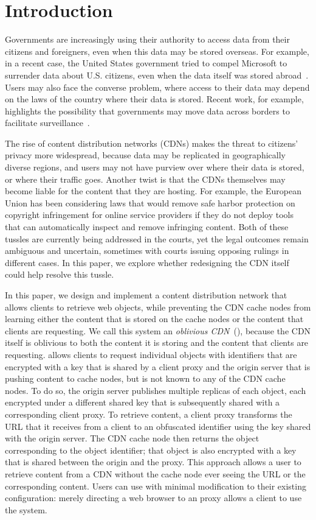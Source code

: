 \section{Introduction}
\label{sec:intro}

Governments are increasingly using their authority to access data from
their citizens and foreigners, even when this data may be stored overseas.  For
example, in a
recent case, the United States government tried to compel Microsoft to
surrender data about U.S. citizens, even when the data itself was stored
abroad~\cite{microsoft_ireland}. Users may also face the converse problem, where access to their data
may depend on the laws of the country where their data is stored. Recent work,
for example, highlights the possibility that governments may move data across
borders to facilitate surveillance~\cite{arnbak2015loopholes}.  

The rise of content distribution networks (CDNs) makes the threat to citizens'
privacy more widespread, because data may be replicated in geographically
diverse regions, and users may not have purview over where their data is
stored, or where their traffic goes. Another twist is that the CDNs themselves
may become liable for the content that they are hosting. For example, the
European Union has been considering laws that would remove safe harbor
protection on copyright infringement for online service providers if they do
not deploy tools that can automatically inspect and remove infringing content.
Both of these tussles are currently being addressed in the courts, yet the
legal outcomes remain ambiguous and uncertain, sometimes with courts issuing
opposing rulings in different cases. In this paper, we explore whether redesigning
the CDN itself could help resolve this tussle.


In this paper, we design and implement a content distribution network that
allows clients to retrieve web objects, while preventing the CDN cache nodes
from learning either the content that is stored on the cache nodes or the
content that clients are requesting. We call this system an {\em oblivious
CDN}~(\system{}), because the CDN itself is oblivious to both the content it is
storing and the content that clients are requesting. \system{} allows clients to
request individual objects with identifiers that are encrypted with a key that
is shared by a client proxy and the origin server that is pushing content to
cache nodes, but is not known to any of the CDN cache nodes.  To do so, the
origin server publishes multiple replicas of each object, each encrypted under
a different shared key that is subsequently shared with a corresponding client
proxy. To retrieve content, a client proxy transforms the URL that it receives
from a client to an obfuscated identifier using the key shared with the origin
server. The CDN cache node then returns the object corresponding to the object
identifier; that object is also encrypted with a key that is shared between
the origin and the proxy. This approach allows a user to retrieve content from
a CDN without the cache node ever seeing the URL or the corresponding content.
Users can use \system{} with minimal modification to their existing configuration:
merely directing a web browser to an \system{} proxy allows a client to use the
system.


